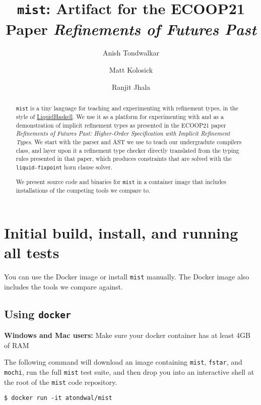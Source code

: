 \documentclass[
]{darts-v2021}
\author{Anish Tondwalkar}{UC San Diego}{atondwal@eng.ucsd.edu}{}{}{}{}{}{}
\author{Matt Kolosick}{UC San Diego}{mkolosick@eng.ucsd.edu}{}{}{}{}{}{}
\author{Ranjit Jhala}{UC San Diego}{rjhala@cs.ucsd.edu}{}{}{}{}{}{}
\title{\texttt{mist}: Artifact for the ECOOP21 Paper \emph{Refinements
of Futures Past}}
\date{}
\renewenvironment{quote}{\begin{myquote}}{\end{myquote}}
\begin{document}
\maketitle
\begin{abstract}
\texttt{mist} is a tiny language for teaching and experimenting with
refinement types, in the style of
\href{https://github.com/ucsd-progsys/liquidhaskell}{LiquidHaskell}. We
use it as a platform for experimenting with and as a demonstration of
implicit refinement types as presented in the ECOOP21 paper
\emph{Refinements of Futures Past: Higher-Order Specification with
Implicit Refinement Types}. We start with the parser and AST we use to
teach our undergradute compilers class, and layer upon it a refinement
type checker directly translated from the typing rules presented in that
paper, which produces constraints that are solved with the
\texttt{liquid-fixpoint} horn clause solver.

We present source code and binaries for \texttt{mist} in a container
image that includes installations of the competing tools we compare to.
\end{abstract}

\hypertarget{initial-build-install-and-running-all-tests}{%
\section{Initial build, install, and running all
tests}\label{initial-build-install-and-running-all-tests}}

You can use the Docker image or install \texttt{mist} manually. The
Docker image also includes the tools we compare against.

\hypertarget{using-docker}{%
\subsection{\texorpdfstring{Using
\texttt{docker}}{Using docker}}\label{using-docker}}

\begin{quote}
\textbf{Windows and Mac users:} Make sure your docker container has at
least 4GB of RAM
\end{quote}

The following command will download an image containing \texttt{mist},
\texttt{fstar}, and \texttt{mochi}, run the full \texttt{mist} test
suite, and then drop you into an interactive shell at the root of the
\texttt{mist} code repository.

\begin{verbatim}
$ docker run -it atondwal/mist
\end{verbatim}
\end{document}
